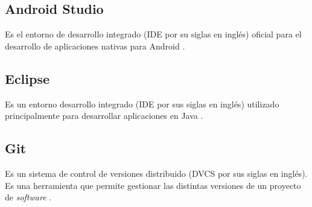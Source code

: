 \subsection{Android Studio}
Es el entorno de desarrollo integrado (IDE por su siglas en inglés) oficial para el desarrollo de aplicaciones nativas para Android \cite{ASD1}.

\subsection{Eclipse}
Es un entorno desarrollo integrado (IDE por sus siglas en inglés) utilizado principalmente para desarrollar aplicaciones en Java \cite{ECL1}.

\subsection{Git}
Es un sistema de control de versiones distribuido (DVCS por sus siglas en inglés). Es una herramienta que permite gestionar las distintas versiones de un proyecto de \textit{software} \cite{GIT1}.
